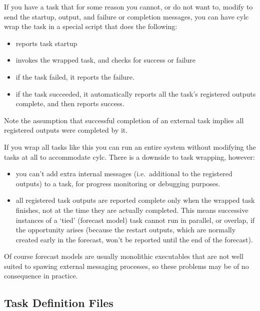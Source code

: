 \documentclass[11pt,a4paper]{article}
\begin{document}
If you have a task that for some reason you cannot, or do not want to,
modify to send the startup, output, and failure or completion messages, 
you can have cylc wrap the task in a special script that does the following:

\begin{itemize}
    \item reports task startup
    \item invokes the wrapped task, and checks for success or failure
    \item if the task failed, it reports the failure. 
    \item if the task succeeded, it automatically reports all the task's
        registered outputs complete, and then reports success.
\end{itemize}

Note the assumption that successful completion of an external task
implies all registered outputs were completed by it.

If you wrap all tasks like this you can run an entire system without
modifying the tasks at all to accommodate cylc. There is a downside to
task wrapping, however:

\begin{itemize}
    \item you can't add extra internal messages (i.e.\ additional to the
        registered outputs) to a task, for progress monitoring or
        debugging purposes.
    \item all registered task outputs are reported complete only
        when the wrapped task finishes, not at the time they are actually
        completed. This means successive instances of a `tied' (forecast
        model) task cannot run in parallel, or overlap, if the
        opportunity arises (because the restart outputs, which are
        normally created early in the forecast, won't be reported until
        the end of the forecast).
\end{itemize} 

Of course forecast models are usually monolithic executables that are not
well suited to spawing external messaging processes, so these problems
may be of no consequence in practice.

\pagebreak

\subsection{Task Definition Files} 
\label{TaskDefinitionFiles}
\end{document}
